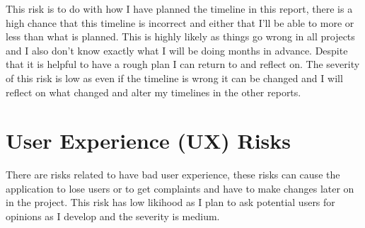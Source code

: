 \documentclass[]{project_report}
\begin{document}
This risk is to do with how I have planned the timeline in this report, there is a high chance that this timeline is incorrect and either that I'll be able to more or less than what is planned. This is highly likely as things go wrong in all projects and I also don't know exactly what I will be doing months in advance. Despite that it is helpful to have a rough plan I can return to and reflect on. The severity of this risk is low as even if the timeline is wrong it can be changed and I will reflect on what changed and alter my timelines in the other reports.

\section{User Experience (UX) Risks}

There are risks related to have bad user experience, these risks can cause the application to lose users or to get complaints and have to make changes later on in the project. This risk has low likihood as I plan to ask potential users for opinions as I develop and the severity is medium.

\newpage
\end{document}

